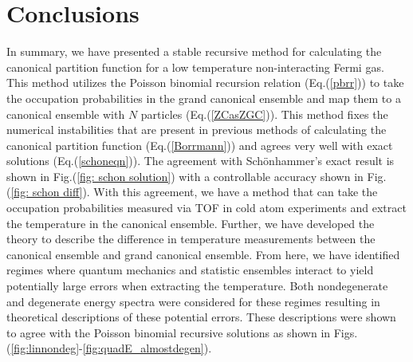 \chapter{Conclusions} \label{ch:conclusion}
In summary, we have presented a stable recursive method for calculating the canonical partition function for a low temperature non-interacting Fermi gas. This method utilizes the Poisson binomial recursion relation (Eq.\@ (\ref{pbrr})) to take the occupation probabilities in the grand canonical ensemble and map them to a canonical ensemble with $N$ particles (Eq.\@(\ref{ZCasZGC})). This method fixes the numerical instabilities that are present in previous methods of calculating the canonical partition function (Eq.\@ (\ref{Borrmann})) and agrees very well with exact solutions (Eq.\@ (\ref{schoneqn})). The agreement with Sch\"onhammer's exact result is shown in Fig.\@ (\ref{fig: schon solution}) with a controllable accuracy shown in Fig.\@ (\ref{fig: schon diff}). With this agreement, we have a method that can take the occupation probabilities measured via TOF in cold atom experiments and extract the temperature in the canonical ensemble. Further, we have developed the theory to describe the difference in temperature measurements between the canonical ensemble and grand canonical ensemble. From here, we have identified regimes where quantum mechanics and statistic ensembles interact to yield potentially large errors when extracting the temperature. Both nondegenerate and degenerate energy spectra were considered for these regimes resulting in theoretical descriptions of these potential errors. These descriptions were shown to agree with the Poisson binomial recursive solutions as shown in Figs. (\ref{fig:linnondeg}-\ref{fig:quadE_almostdegen}).

